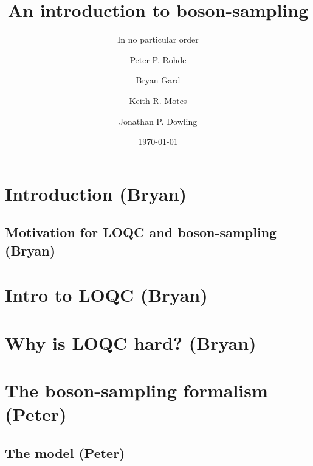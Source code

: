 \documentclass[aps,pra,twocolumn,amsmath,amssymb,nofootinbib,superscriptaddress]{revtex4}
\begin{document}


%
%

\title{An introduction to boson-sampling}

%
%

\author{In no particular order}

\author{Peter P. Rohde}

\author{Bryan Gard}

\author{Keith R. Motes}

\author{Jonathan P. Dowling}

\date{\today}

\frenchspacing

%
%

\begin{abstract}
\end{abstract}

\maketitle

\section{Introduction (Bryan)}

\subsection{Motivation for LOQC and boson-sampling (Bryan)}

\section{Intro to LOQC (Bryan)}

\section{Why is LOQC hard? (Bryan)}

\section{The boson-sampling formalism (Peter)}

\subsection{The model (Peter)}
\end{document}
